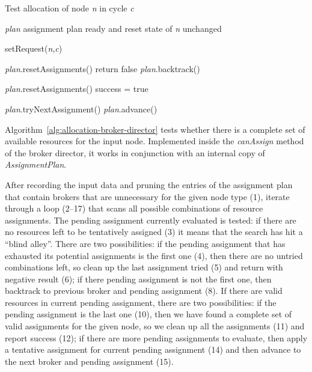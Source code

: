 \documentclass[a4paper,twoside]{tce}
\begin{document}
\begin{algorithm}
  \caption{Test allocation of node \emph{n} in cycle \emph{c}}
  \label{alg:allocation-broker-director}
  \renewcommand{\algorithmiccomment}[1]{\hspace{4ex}// #1}
\begin{algorithmic}[1]
  \REQUIRE \emph{plan} assignment plan ready and reset
  \ENSURE  state of \emph{n} unchanged

  \STATE setRequest(\emph{n},\emph{c})

        \STATE \emph{plan}.resetAssignments()
        \STATE return false 
      \ELSE
        \STATE \emph{plan}.backtrack()
      \ENDIF

      \STATE \emph{plan}.resetAssignments()
      \STATE success = true 

    \ELSE
      \STATE \emph{plan}.tryNextAssignment()
      \STATE \emph{plan}.advance()
    \ENDIF
  \ENDWHILE
\end{algorithmic}
\end{algorithm}
%
Algorithm~\ref{alg:allocation-broker-director} tests whether there is a
complete set of available resources for the input node. Implemented inside
the \emph{canAssign} method of the broker director, it works in conjunction
with an internal copy of \emph{AssignmentPlan}.

After recording the input data and pruning the entries of the assignment
plan that contain brokers that are unnecessary for the given node type (1),
iterate through a loop (2--17) that scans all possible combinations of
resource assignments. The pending assignment currently evaluated is tested:
if there are no resources left to be tentatively assigned (3) it means that
the search has hit a ``blind alley''. There are two possibilities: if the
pending assignment that has exhausted its potential assignments is the first
one (4), then there are no untried combinations left, so clean up the last
assignment tried (5) and return with negative result (6); if there pending
assignment is not the first one, then backtrack to previous broker and
pending assignment (8). If there are valid resources in current pending
assignment, there are two possibilities: if the pending assignment is the
last one (10), then we have found a complete set of valid assignments for
the given node, so we clean up all the assignments (11) and report success
(12); if there are more pending assignments to evaluate, then apply a
tentative assignment for current pending assignment (14) and then advance to
the next broker and pending assignment (15).
\end{document}

